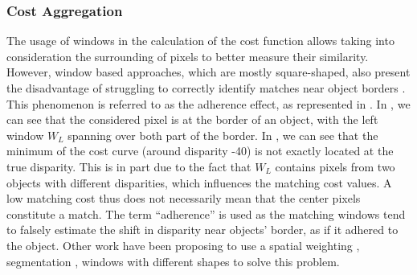 \subsubsection{Cost Aggregation}
The usage of windows in the calculation of the cost function allows taking into consideration the surrounding of pixels to better measure their similarity. However, window based approaches, which are mostly square-shaped, also present the disadvantage of struggling to correctly identify matches near object borders \cite{hirschmuller_real-time_2002}. This phenomenon is referred to as the adherence effect, as represented in . In , we can see that the considered pixel is at the border of an object, with the left window $W_L$ spanning over both part of the border. In , we can see that the minimum of the cost curve (around disparity -40) is not exactly located at the true disparity. This is in part due to the fact that $W_L$ contains pixels from two objects with different disparities, which influences the matching cost values. A low matching cost thus does not necessarily mean that the center pixels constitute a match. The term ``adherence'' is used as the matching windows tend to falsely estimate the shift in disparity near objects' border, as if it adhered to the object. Other work have been proposing to use a spatial weighting \cite{kuk-jin_yoon_locally_2005}, segmentation \cite{hutchison_segmentation-based_2007}, windows with different shapes \cite{ke_zhang_cross-based_2009, buades_reliable_2015} to solve this problem. 

